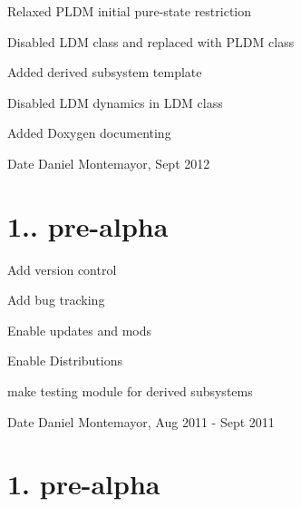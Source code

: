 \begin{DoxyItemize}
\item Relaxed P\+L\+D\+M initial pure-\/state restriction
\item Disabled L\+D\+M class and replaced with P\+L\+D\+M class
\item Added derived subsystem template
\item Disabled L\+D\+M dynamics in L\+D\+M class
\item Added Doxygen documenting \begin{DoxyDate}{Date}
Daniel Montemayor, Sept 2012
\end{DoxyDate}

\end{DoxyItemize}\hypertarget{_tags_v1_0_1pa}{}\section{1.. pre-\/alpha}\label{_tags_v1_0_1pa}

\begin{DoxyItemize}
\item Add version control
\item Add bug tracking
\item Enable updates and mods
\item Enable Distributions
\item make testing module for derived subsystems \begin{DoxyDate}{Date}
Daniel Montemayor, Aug 2011 -\/ Sept 2011
\end{DoxyDate}

\end{DoxyItemize}\hypertarget{_tags_v1_0pa}{}\section{1. pre-\/alpha}\label{_tags_v1_0pa}


